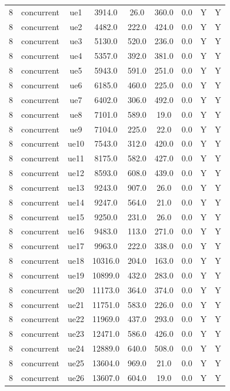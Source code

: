 \begin{table}[ht]
\begin{tabular}{|c|c|c|c|c|c|c|c|c|}
\hline
8 & concurrent & ue1 & 3914.0 & 26.0 & 360.0 & 0.0 & Y & Y \\
8 & concurrent & ue2 & 4482.0 & 222.0 & 424.0 & 0.0 & Y & Y \\
8 & concurrent & ue3 & 5130.0 & 520.0 & 236.0 & 0.0 & Y & Y \\
8 & concurrent & ue4 & 5357.0 & 392.0 & 381.0 & 0.0 & Y & Y \\
8 & concurrent & ue5 & 5943.0 & 591.0 & 251.0 & 0.0 & Y & Y \\
8 & concurrent & ue6 & 6185.0 & 460.0 & 225.0 & 0.0 & Y & Y \\
8 & concurrent & ue7 & 6402.0 & 306.0 & 492.0 & 0.0 & Y & Y \\
8 & concurrent & ue8 & 7101.0 & 589.0 & 19.0 & 0.0 & Y & Y \\
8 & concurrent & ue9 & 7104.0 & 225.0 & 22.0 & 0.0 & Y & Y \\
8 & concurrent & ue10 & 7543.0 & 312.0 & 420.0 & 0.0 & Y & Y \\
8 & concurrent & ue11 & 8175.0 & 582.0 & 427.0 & 0.0 & Y & Y \\
8 & concurrent & ue12 & 8593.0 & 608.0 & 439.0 & 0.0 & Y & Y \\
8 & concurrent & ue13 & 9243.0 & 907.0 & 26.0 & 0.0 & Y & Y \\
8 & concurrent & ue14 & 9247.0 & 564.0 & 21.0 & 0.0 & Y & Y \\
8 & concurrent & ue15 & 9250.0 & 231.0 & 26.0 & 0.0 & Y & Y \\
8 & concurrent & ue16 & 9483.0 & 113.0 & 271.0 & 0.0 & Y & Y \\
8 & concurrent & ue17 & 9963.0 & 222.0 & 338.0 & 0.0 & Y & Y \\
8 & concurrent & ue18 & 10316.0 & 204.0 & 163.0 & 0.0 & Y & Y \\
8 & concurrent & ue19 & 10899.0 & 432.0 & 283.0 & 0.0 & Y & Y \\
8 & concurrent & ue20 & 11173.0 & 364.0 & 374.0 & 0.0 & Y & Y \\
8 & concurrent & ue21 & 11751.0 & 583.0 & 226.0 & 0.0 & Y & Y \\
8 & concurrent & ue22 & 11969.0 & 437.0 & 293.0 & 0.0 & Y & Y \\
8 & concurrent & ue23 & 12471.0 & 586.0 & 426.0 & 0.0 & Y & Y \\
8 & concurrent & ue24 & 12889.0 & 640.0 & 508.0 & 0.0 & Y & Y \\
8 & concurrent & ue25 & 13604.0 & 969.0 & 21.0 & 0.0 & Y & Y \\
8 & concurrent & ue26 & 13607.0 & 604.0 & 19.0 & 0.0 & Y & Y \\

\end{tabular}
\end{table}
